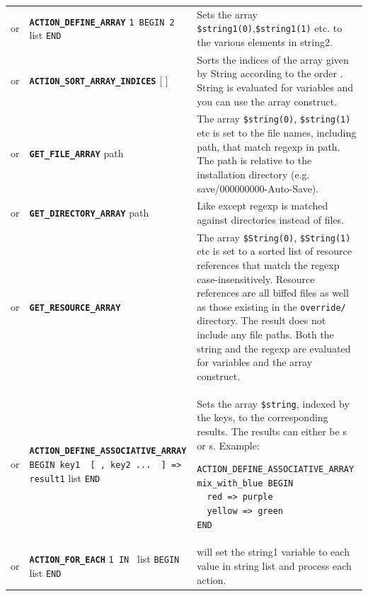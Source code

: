 \documentclass{article}
\def\ttref#1{\ahrefloc{#1}{\tt #1}}
\def\DEFINE#1{{\tt \bf #1}\label{#1}\index{#1}}
\def\t#1{{\tt #1}}
\def\Slist{{\color{red} list }}
\def\Ob{{\color{red} [ }}
\def\Oe{{\color{red} ] }}
\begin{document}
\begin{tabular}{cp{10in}|p{10in}}
or & \DEFINE{ACTION_DEFINE_ARRAY} \t{\ttref{String}1 BEGIN \ttref{String}2} \Slist \t{END} &
	Sets the array \verb+$string1(0)+,\verb+$string1(1)+ etc. to the various elements in string2.
\\
or & \DEFINE{ACTION_SORT_ARRAY_INDICES} \t{\ttref{String}}
  \Ob \ttref{ArrayIndicesSortType} \Oe &

  Sorts the indices of the array given by String according to the
  order \ttref{ArrayIndicesSortType}. String is evaluated for
  variables and you can use the array construct.\\

or & \DEFINE{GET_FILE_ARRAY} \ttref{String} path \ttref{regexp} &
  The array \verb+$string(0)+, \verb+$string(1)+ etc is set to the file names, including path, that match regexp in path. The path is relative to the installation directory (e.g. save/000000000-Auto-Save).\\
or & \DEFINE{GET_DIRECTORY_ARRAY} \ttref{String} path \ttref{regexp} &
  Like \ttref{GET_FILE_ARRAY} except regexp is matched against directories instead of files.\\

or & \DEFINE{GET_RESOURCE_ARRAY} \ttref{String} \ttref{regexp} &

  The array \verb+$String(0)+, \verb+$String(1)+ etc is set to a
  sorted list of resource references that match the regexp
  case-insensitively. Resource references are all biffed files as well
  as those existing in the \t{override/} directory. The result does
  not include any file paths. Both the string and the regexp are
  evaluated for variables and the array construct. \\

or & \DEFINE{ACTION_DEFINE_ASSOCIATIVE_ARRAY} \t{\ttref{String} BEGIN key1 \Ob , key2 ... \Oe => result1} \Slist \t{END} &
  Sets the array \verb+$string+, indexed by the keys, to the corresponding results. The results can either be \ttref{String}s or \ttref{value}s.
  Example:
\begin{verbatim}
ACTION_DEFINE_ASSOCIATIVE_ARRAY mix_with_blue BEGIN
  red => purple
  yellow => green
END
\end{verbatim}\\
or & \DEFINE{ACTION_FOR_EACH} \t{\ttref{String}1 IN \ttref{String}} \Slist
                              \t{BEGIN} \ttref{TP2 Action} \Slist \t{END} &
    will set the string1 variable to each value in string list and process each action. \\


\end{tabular}
\end{document}
